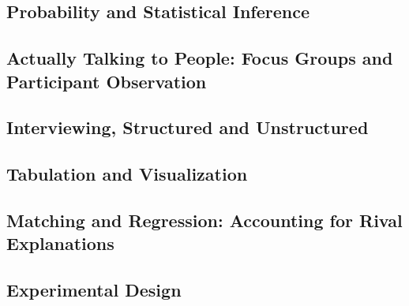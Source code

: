 \documentclass[12pt,a4paper]{article}
\begin{document}
\subsection{Probability and Statistical Inference}

\subsection{Actually Talking to People: Focus Groups and Participant Observation}


\subsection{Interviewing, Structured and Unstructured}

\subsection{Tabulation and Visualization}

\subsection{Matching and Regression: Accounting for Rival Explanations}

\subsection{Experimental Design}
\end{document}
